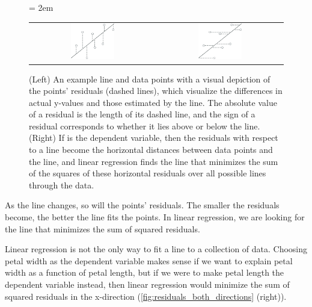 \begin{figure}[h]
\centering
\mySfFamily
\tabcolsep = 2em
\begin{tabular}{c c}
\includegraphics[width = 0.36\textwidth]{../images_CMYK/residuals_y_coordinates} & \includegraphics[width = 0.36\textwidth]{../images_CMYK/residuals_x_coordinates}
\end{tabular}
\caption{(Left) An example line and data points with a visual depiction of the points' residuals (dashed lines), which visualize the differences in actual y-values and those estimated by the line. The absolute value of a residual is the length of its dashed line, and the sign of a residual corresponds to whether it lies above or below the line. (Right) If  is the dependent variable, then the residuals with respect to a line become the horizontal distances between data points and the line, and linear regression finds the line that minimizes the sum of the squares of these horizontal residuals over all possible lines through the data.}
\label{fig:residuals_both_directions}
\end{figure}

As the line changes, so will the points' residuals. The smaller the residuals become, the better the line fits the points. In linear regression, we are looking for the line that minimizes the sum of squared residuals.

Linear regression is not the only way to fit a line to a collection of data. Choosing petal width as the dependent variable makes sense if we want to explain petal width as a function of petal length, but if we were to make petal length the dependent variable instead, then linear regression would minimize the sum of squared residuals in the x-direction (\autoref{fig:residuals_both_directions} (right)).\\

